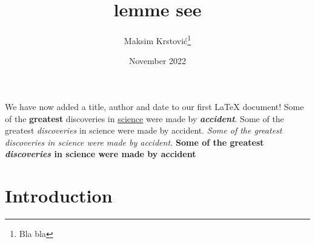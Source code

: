 \documentclass{article}
\title{lemme see}
\author{Maksim Krstović\thanks{Bla bla}}
\date{November 2022}
\begin{document}
\maketitle
We have now added a title, author and date to our first \LaTeX{} document!
Some of the \textbf{greatest} discoveries in \underline{science} were made by \textbf{\textit{accident}}. 
Some of the greatest \emph{discoveries} in science 
were made by accident.
\textit{Some of the greatest \emph{discoveries} 
in science were made by accident.}
\textbf{Some of the greatest \emph{discoveries} in science were made by accident}
\section{Introduction}
\end{document}
